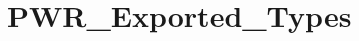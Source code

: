 \hypertarget{group___p_w_r___exported___types}{}\section{P\+W\+R\+\_\+\+Exported\+\_\+\+Types}
\label{group___p_w_r___exported___types}
